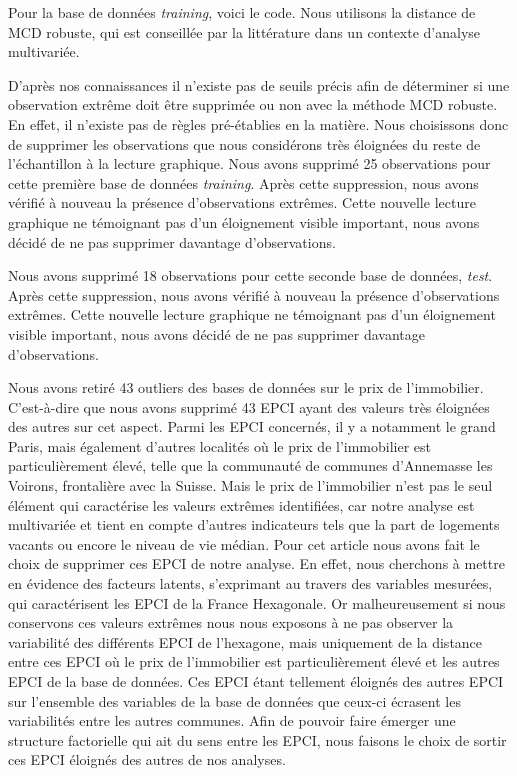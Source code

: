 \documentclass[
  french,
  11pt,
  a4paper,
]{article}
\begin{document}
Pour la base de données \emph{training}, voici le code. Nous utilisons
la distance de MCD robuste, qui est conseillée par la littérature dans
un contexte d'analyse multivariée.

D'après nos connaissances il n'existe pas de seuils précis afin de
déterminer si une observation extrême doit être supprimée ou non avec la
méthode MCD robuste. En effet, il n'existe pas de règles pré-établies en
la matière. Nous choisissons donc de supprimer les observations que nous
considérons très éloignées du reste de l'échantillon à la lecture
graphique. Nous avons supprimé 25 observations pour cette première base
de données \emph{training}. Après cette suppression, nous avons vérifié
à nouveau la présence d'observations extrêmes. Cette nouvelle lecture
graphique ne témoignant pas d'un éloignement visible important, nous
avons décidé de ne pas supprimer davantage d'observations.

Nous avons supprimé 18 observations pour cette seconde base de données,
\emph{test}. Après cette suppression, nous avons vérifié à nouveau la
présence d'observations extrêmes. Cette nouvelle lecture graphique ne
témoignant pas d'un éloignement visible important, nous avons décidé de
ne pas supprimer davantage d'observations.

Nous avons retiré 43 outliers des bases de données sur le prix de
l'immobilier. C'est-à-dire que nous avons supprimé 43 EPCI ayant des
valeurs très éloignées des autres sur cet aspect. Parmi les EPCI
concernés, il y a notamment le grand Paris, mais également d'autres
localités où le prix de l'immobilier est particulièrement élevé, telle
que la communauté de communes d'Annemasse les Voirons, frontalière avec
la Suisse. Mais le prix de l'immobilier n'est pas le seul élément qui
caractérise les valeurs extrêmes identifiées, car notre analyse est
multivariée et tient en compte d'autres indicateurs tels que la part de
logements vacants ou encore le niveau de vie médian. Pour cet article
nous avons fait le choix de supprimer ces EPCI de notre analyse. En
effet, nous cherchons à mettre en évidence des facteurs latents,
s'exprimant au travers des variables mesurées, qui caractérisent les
EPCI de la France Hexagonale. Or malheureusement si nous conservons ces
valeurs extrêmes nous nous exposons à ne pas observer la variabilité des
différents EPCI de l'hexagone, mais uniquement de la distance entre ces
EPCI où le prix de l'immobilier est particulièrement élevé et les autres
EPCI de la base de données. Ces EPCI étant tellement éloignés des autres
EPCI sur l'ensemble des variables de la base de données que ceux-ci
écrasent les variabilités entre les autres communes. Afin de pouvoir
faire émerger une structure factorielle qui ait du sens entre les EPCI,
nous faisons le choix de sortir ces EPCI éloignés des autres de nos
analyses.
\end{document}
